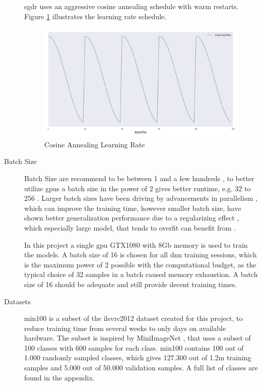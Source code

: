 \begin{description}
	\gls{sgdr} uses an aggressive cosine annealing schedule with warm restarts. Figure \ref{fig:cosineannealing} illustrates the learning rate schedule.
	
	\begin{figure}
		\centering
		\includegraphics[width=.7\linewidth]{figures/lr.png}
		\caption[Cosine Annealing Learning Rate]{Cosine Annealing Learning Rate} \label{fig:cosineannealing}
	\end{figure}

	\item[Batch Size] Batch Size are recommend to be between 1 and a few hundreds \cite{bengio_practical_2012}, to better utilize \gls{gpu}s a batch size in the power of 2 gives better runtime, e.g. 32 to 256 \cite{goodfellow_deep_2016}. Larger batch sizes have been driving by advancements in parallelism \cite{dean_large_2012}, which can improve the training time, however smaller batch size, have shown better generalization performance due to a regularizing effect \cite{masters_revisiting_nodate}, which especially large model, that tends to overfit can benefit from \cite{goodfellow_deep_2016}. 
	
	In this project a single \gls{gpu} GTX1080 with 8Gb memory is used to train the models. A batch size of 16 is chosen for all \gls{dnn} training sessions, which is the maximum power of 2 possible with the computational budget, as the typical choice of 32 samples in a batch caused memory exhaustion. A batch size of 16 should be adequate and still provide decent training times.
	
	\item[Datasets] \gls{min100} is a subset of the \gls{ilsvrc2012} dataset \cite{russakovsky_imagenet_2015} created for this project, to reduce training time from several weeks to only days on available hardware. The subset is inspired by MiniImageNet \cite{vinyals_matching_2016}, that uses a subset of 100 classes with 600 samples for each class. \gls{min100} contains 100 out of 1.000 randomly sampled classes, which gives 127.300 out of 1.2m training samples and 5.000 out of 50.000 validation samples. A full list of classes are found in the appendix. 
	

\end{description}

